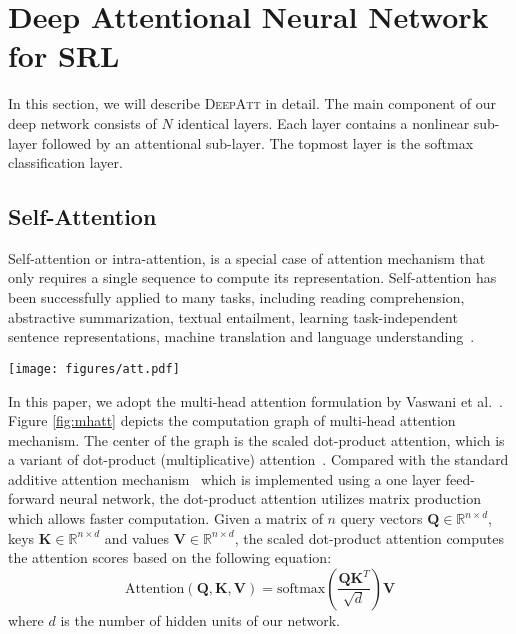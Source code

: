 \documentclass[letterpaper]{article} \usepackage{aaai18}  \usepackage{times}  \usepackage{helvet}  \usepackage{courier}  \usepackage{url}  \usepackage{graphicx}  \frenchspacing  \setlength{\pdfpagewidth}{8.5in}  \setlength{\pdfpageheight}{11in}  \usepackage{latexsym}
\begin{document}
\section{Deep Attentional Neural Network for SRL}
In this section, we will describe \textsc{DeepAtt} in detail. The main component of our deep network consists of $N$ identical layers. Each layer contains a nonlinear sub-layer followed by an attentional sub-layer. The topmost layer is the softmax classification layer.

\subsection{Self-Attention}
Self-attention or intra-attention, is a special case of attention mechanism that only requires a single sequence to compute its representation. Self-attention has been successfully applied to many tasks, including reading comprehension, abstractive summarization, textual entailment, learning task-independent sentence representations, machine translation and language understanding~\cite{cheng2016long,parikh2016decomposable,lin2017structured,paulus2017deep,vaswani2017attention,shen2017disan}.

\begin{figure*}[!ht]
\centering
\texttt{[image: figures/att.pdf]}
\caption{The computation graph of multi-head self-attention mechanism. All heads can be computed in parallel using highly optimized matrix multiplication codes.}
\label{fig:mhatt}
\end{figure*}

In this paper, we adopt the multi-head attention formulation by Vaswani et al.~. Figure \ref{fig:mhatt} depicts the computation graph of multi-head attention mechanism. The center of the graph is the scaled dot-product attention, which is a variant of dot-product (multiplicative) attention~\cite{luong2015effective}. Compared with the standard additive attention mechanism~\cite{bahdanau2014neural} which is implemented using a one layer feed-forward neural network, the dot-product attention utilizes matrix production which allows faster computation. Given a matrix of $n$ query vectors $\mathbf{Q} \in \mathbb{R}^{n \times d}$, keys $\mathbf{K} \in \mathbb{R}^{n \times d}$ and values $\mathbf{V} \in \mathbb{R}^{n \times d}$, the scaled dot-product attention computes the attention scores based on the following equation:
\begin{equation}
\textrm{Attention}(\mathbf{Q}, \mathbf{K}, \mathbf{V}) = \textrm{softmax}(\frac{\mathbf{Q}\mathbf{K}^T}{\sqrt{d}})\mathbf{V}
\end{equation}
where $d$ is the number of hidden units of our network.
\end{document}
